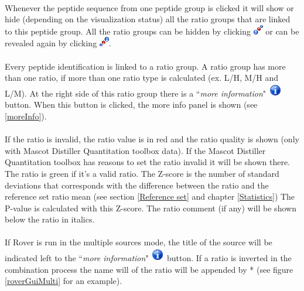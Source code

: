 \documentclass[11pt,a4paper,oneside,notitlepage]{book}
\begin{document}
\paragraph{}Whenever the peptide sequence from one peptide group is clicked it will show or hide (depending on the visualization status) all the ratio groups that are linked to this peptide group. All the ratio groups can be hidden by clicking \includegraphics[scale=0.6, H]{hide.png} or can be revealed again by clicking \includegraphics[scale=0.6, H]{show.png}.

\paragraph{}Every peptide identification is linked to a ratio group. A ratio group has more than one ratio, if more than one ratio type is calculated (ex. L/H, M/H and L/M). At the right side of this ratio group there is a ``\textit{more information}" \includegraphics[scale=0.6, H]{info.png} button. When this button is clicked, the more info panel is shown (see \ref{moreInfo}).

\paragraph{}If the ratio is invalid, the ratio value is in red and the ratio quality is shown (only with Mascot Distiller Quantitation toolbox data). If the Mascot Distiller Quantitation toolbox has reasons to set the ratio invalid it will be shown there. The ratio is green if it's a valid ratio. The Z-score is the number of standard deviations that corresponds with the difference between the ratio and the reference set ratio mean (see section \ref{Reference set} and chapter \ref{Statistics}) The P-value is calculated with this Z-score. The ratio comment (if any) will be shown below the ratio in italics.


\paragraph{}If Rover is run in the multiple sources mode, the title of the source will be indicated left to the ``\textit{more information}" \includegraphics[scale=0.6, H]{info.png} button. If a ratio is inverted in the combination process the name will of the ratio will be appended by * (see figure \ref{roverGuiMulti} for an example).
\end{document}
